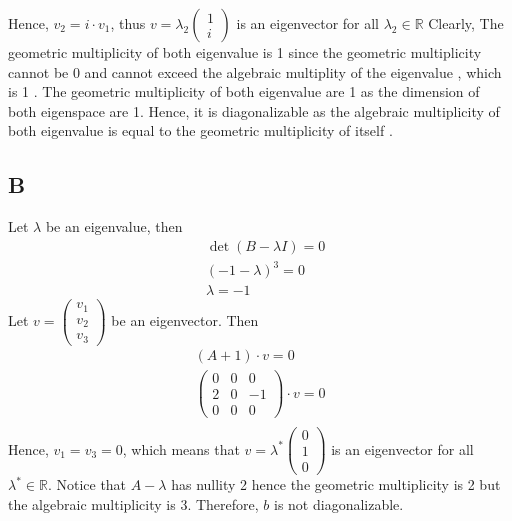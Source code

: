 \documentclass[11pt]{article}
\begin{document}
Hence, $v_2 = i\cdot v_1$, thus $v = \lambda_2 \begin{pmatrix}
    1 \\
    i
\end{pmatrix}
$
is an eigenvector for all $\lambda_2 \in \mathbb{R}$
Clearly, The geometric multiplicity of both eigenvalue
is 1
since the geometric multiplicity cannot be 0
and cannot exceed the algebraic multiplity of the eigenvalue
, which is 1
. The geometric multiplicity of both eigenvalue are 1 as the dimension of both eigenspace are 1. Hence, it is diagonalizable
as the algebraic multiplicity of both eigenvalue
is equal to the geometric multiplicity of itself
.
\subsection*{B}
Let $\lambda$ be an eigenvalue, then 
\begin{equation*}
    \begin{aligned}
        &\det (B - \lambda I) = 0 \\
        &(-1-\lambda)^3 = 0 \\
        &\lambda = -1
    \end{aligned}
\end{equation*}
Let $v = \begin{pmatrix}
    v_1 \\
    v_2 \\
    v_3
\end{pmatrix}
$ be an eigenvector. Then 
\begin{equation*}
    \begin{aligned}
        (A +1) \cdot v = 0 \\
        \begin{pmatrix}
            0 & 0 & 0 \\
            2 & 0 & -1 \\
            0 & 0 & 0
        \end{pmatrix}
        \cdot v = 0 \\
    \end{aligned}
\end{equation*}
Hence, $v_1 = v_3 = 0$, which means that $v = \lambda^* \begin{pmatrix}
    0 \\
    1 \\
    0
\end{pmatrix}$ is an eigenvector for all $\lambda^* \in \mathbb{R}$. Notice that 
$A - \lambda$ has nullity 2 hence the geometric multiplicity is 2 but the algebraic multiplicity is 3. 
Therefore, $b$ is not diagonalizable.
\newpage
\end{document}
